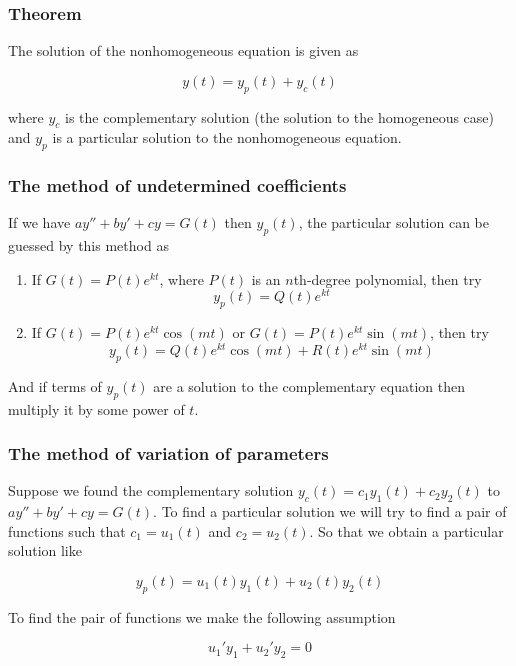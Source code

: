 \documentclass[a4paper]{article}
\begin{document}
\subsubsection*{Theorem}

The solution of the nonhomogeneous equation is given as 

\begin{equation}
    y(t)=y_p(t)+y_c(t)
\end{equation}

where $y_c$ is the complementary solution (the solution to the homogeneous case) and $y_p$ is a particular solution to the nonhomogeneous equation.

\subsubsection*{The method of undetermined coefficients}

If we have $ay''+by'+cy=G(t)$ then $y_p(t)$, the particular solution can be guessed by this method as

\begin{enumerate}
    \item If $G(t)=P(t)e^{kt}$, where $P(t)$ is an $n$th-degree polynomial, then try $$y_p(t)=Q(t)e^{kt}$$
    \item If $G(t)=P(t)e^{kt}\cos(mt)$ or $G(t)=P(t)e^{kt}\sin(mt)$, then try $$y_p(t)=Q(t)e^{kt}\cos(mt) + R(t)e^{kt}\sin(mt)$$
\end{enumerate}

And if terms of $y_p(t)$ are a solution to the complementary equation then multiply it by some power of $t$.

\subsubsection*{The method of variation of parameters}

Suppose we found the complementary solution $y_c(t)=c_1y_1(t)+c_2y_2(t)$ to $ay''+by'+cy=G(t)$. To find a particular solution we will try to find a pair of functions such that $c_1=u_1(t)$ and $c_2=u_2(t)$. So that we obtain a particular solution like

\begin{equation}
    y_p(t)=u_1(t)y_1(t)+u_2(t)y_2(t)
\end{equation}

To find the pair of functions we make the following assumption

\begin{equation}
    u_1'y_1+u_2'y_2=0
\end{equation}
\end{document}
